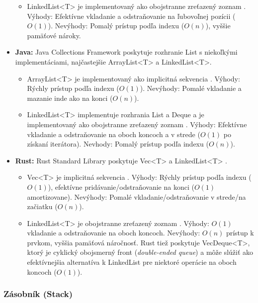 \documentclass[11pt]{article}
\begin{document}
\begin{itemize}
\begin{itemize}
    \item LinkedList<T> je implementovaný ako obojstranne zreťazený zoznam \cite{dotnet_docs}. Výhody: Efektívne vkladanie a odstraňovanie na ľubovoľnej pozícii ($O(1)$). Nevýhody: Pomalý prístup podľa indexu ($O(n)$), vyššie pamäťové nároky.
  \end{itemize}
  \item \textbf{Java:} Java Collections Framework poskytuje rozhranie List s niekoľkými implementáciami, najčastejšie ArrayList<T> a LinkedList<T>.
  \begin{itemize}
    \item ArrayList<T> je implementovaný ako implicitná sekvencia \cite{java_docs}. Výhody: Rýchly prístup podľa indexu ($O(1)$). Nevýhody: Pomalé vkladanie a mazanie inde ako na konci ($O(n)$).
    \item LinkedList<T> implementuje rozhrania List a Deque a je implementovaný ako obojstranne zreťazený zoznam \cite{java_docs}. Výhody: Efektívne vkladanie a odstraňovanie na oboch koncoch a v strede ($O(1)$ po získaní iterátora). Nevhody: Pomalý prístup podľa indexu ($O(n)$).
  \end{itemize}
  \item \textbf{Rust:} Rust Standard Library poskytuje Vec<T> a LinkedList<T> \cite{rust_collections}.
  \begin{itemize}
    \item Vec<T> je implicitná sekvencia \cite{rust_collections}. Výhody: Rýchly prístup podľa indexu ($O(1)$), efektívne pridávanie/odstraňovanie na konci ($O(1)$ amortizovane). Nevýhody: Pomalé vkladanie/odstraňovanie v strede/na začiatku ($O(n)$).
    \item LinkedList<T> je obojstranne zreťazený zoznam \cite{rust_collections}. Výhody: $O(1)$ vkladanie a odstraňovanie na oboch koncoch. Nevýhody: $O(n)$ prístup k prvkom, vyššia pamäťová náročnosť. Rust tiež poskytuje VecDeque<T>, ktorý je cyklický obojsmerný front (\textit{double-ended queue}) a môže slúžiť ako efektívnejšia alternatíva k LinkedList pre niektoré operácie na oboch koncoch ($O(1)$).
  \end{itemize}
\end{itemize}

\subsubsection*{Zásobník (Stack)}
\end{document}
